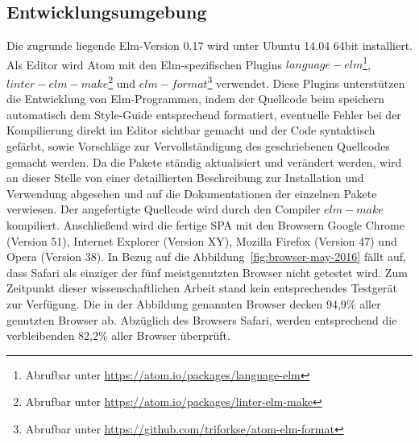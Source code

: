 \subsection{Entwicklungsumgebung}
\label{sec:Entwicklungsumgebung}
Die zugrunde liegende Elm-Version 0.17 wird unter Ubuntu 14.04 64bit installiert. Als Editor wird Atom mit den Elm-spezifischen Plugins $language-elm$\footnote{Abrufbar unter \url{https://atom.io/packages/language-elm}}, $linter-elm-make$\footnote{Abrufbar unter \url{https://atom.io/packages/linter-elm-make}} und $elm-format$\footnote{Abrufbar unter \url{https://github.com/triforkse/atom-elm-format}} verwendet. Diese Plugins unterstützen die Entwicklung von Elm-Programmen, indem der Quellcode beim speichern automatisch dem Style-Guide entsprechend formatiert, eventuelle Fehler bei der Kompilierung direkt im Editor sichtbar gemacht und der Code syntaktisch gefärbt, sowie Vorschläge zur Vervollständigung des geschriebenen Quellcodes gemacht werden. Da die Pakete ständig aktualisiert und verändert werden, wird an dieser Stelle von einer detaillierten Beschreibung zur Installation und Verwendung abgesehen und auf die Dokumentationen der einzelnen Pakete verwiesen.
Der angefertigte Quellcode wird durch den Compiler $elm-make$ kompiliert.
Anschließend wird die fertige \ac{SPA} mit den Browsern Google Chrome (Version 51), Internet Explorer (Version XY), Mozilla Firefox (Version 47) und Opera (Version 38). In Bezug auf die Abbildung~\ref{fig:browser-may-2016} fällt auf, dass Safari als einziger der fünf meistgenutzten Browser nicht getestet wird. Zum Zeitpunkt dieser wissenschaftlichen Arbeit stand kein entsprechendes Testgerät zur Verfügung. Die in der Abbildung genannten Browser decken 94,9\% aller genutzten Browser ab. Abzüglich des Browsers Safari, werden entsprechend die verbleibenden 82,2\% aller Browser überprüft.

